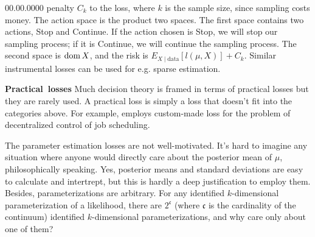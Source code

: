 \begin{lyxlist}{00.00.0000}
penalty $C_{k}$ to the loss, where $k$ is the sample size, since
sampling costs money. The action space is the product two spaces.
The first space contains two actions, Stop and Continue. If the action
chosen is Stop, we will stop our sampling process; if it is Continue,
we will continue the sampling process. The second space is $\operatorname{dom} X$,
and the risk is $E_{X\mid\textrm{data}}[l(\mu,X)]+C_{k}$. Similar
instrumental losses can be used for e.g. sparse estimation.
\item [{\textbf{Practical~losses}}] Much decision theory is framed in
terms of practical losses but they are rarely used. A practical loss
is simply a loss that doesn't fit into the categories above. For example,
\cite{Stankovic1985-th} employs custom-made loss for the problem
of decentralized control of job scheduling. 
\end{lyxlist}
The parameter estimation losses are not well-motivated. It's hard
to imagine any situation where anyone would directly care about the
posterior mean of $\mu$, philosophically speaking. Yes, posterior
means and standard deviations are easy to calculate and intertrept,
but this is hardly a deep justification to employ them. Besides, parameterizations
are arbitrary. For any identified $k$-dimensional parameterization
of a likelihood, there are $2^{\mathfrak{c}}$ (where $\mathfrak{c}$
is the cardinality of the continuum) identified $k$-dimensional parameterizations,
and why care only about one of them? 

